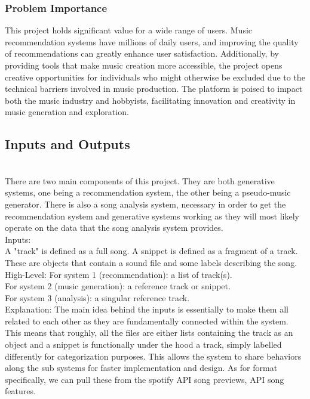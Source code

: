 \documentclass{article}
\begin{document}
\subsubsection{Problem Importance}

This project holds significant value for a wide range of users. Music recommendation systems have millions of daily users, and improving the quality of recommendations can greatly enhance user satisfaction. Additionally, by providing tools that make music creation more accessible, the project opens creative opportunities for individuals who might otherwise be excluded due to the technical barriers involved in music production. The platform is poised to impact both the music industry and hobbyists, facilitating innovation and creativity in music generation and exploration.

\subsection{Inputs and Outputs}

\\

There are two main components of this project. They are both generative systems, one being a recommendation
system, the other being a pseudo-music generator. There is also a song analysis system, necessary in
order to get the recommendation system and generative systems working as they will most likely operate on 
the data that the song analysis system provides. \\

Inputs:\\
A "track" is defined as a full song. A snippet is defined as a fragment of a track. These are objects that 
contain a sound file and some labels describing the song. 
High-Level: 
For system 1 (recommendation): a list of track(s). \\
For system 2 (music generation): a reference track or snippet. \\
For system 3 (analysis): a singular reference track. \\

Explanation: The main idea behind the inputs is essentially to make them all related to each other as they are
fundamentally connected within the system. This means that roughly, all the files are either lists containing
the track as an object and a snippet is functionally under the hood a track, simply labelled differently for
categorization purposes. This allows the system to share behaviors along the sub systems for 
faster implementation and design. As for format specifically, we can pull these from the spotify API song previews,
API song features. \\
\end{document}

